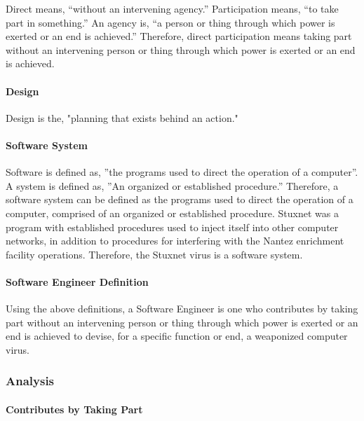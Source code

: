 \documentclass[12pt]{article}
\begin{document}
\begin{multicols}{2}
Direct means, “without an intervening agency.”\cite{merriamWebsterDefinitions} Participation means, “to take part in something.”\cite{cambridgeDictionary} An agency is, “a person or thing through which power is exerted or an end is achieved.”\cite{merriamWebsterDefinitions} Therefore, direct participation means taking part without an intervening person or thing through which power is exerted or an end is achieved.

\paragraph{Design}

Design is the, "planning that exists behind an action."\cite{oxfordDictionary}

\paragraph{Software System}

Software is deﬁned as, ”the programs used to direct the operation of a computer”.\cite{softwareDefinition} A system is deﬁned as, ”An organized or established procedure.”\cite{merriamWebsterDefinitions} Therefore, a software system can be deﬁned as the programs used to direct the operation of a computer, comprised of an organized or established procedure. Stuxnet was a program with established procedures used to inject itself into other computer networks, in addition to procedures for interfering with the Nantez enrichment facility operations. Therefore, the Stuxnet virus is a software system.\cite{w32.stuxnetDossier}

\paragraph{Software Engineer Definition}

Using the above definitions, a Software Engineer is one who contributes by taking part without an intervening person or thing through which power is exerted or an end is achieved to devise, for a speciﬁc function or end, a weaponized computer virus.

\subsubsection{Analysis}

\paragraph{Contributes by Taking Part}


\end{multicols}
\end{document}
